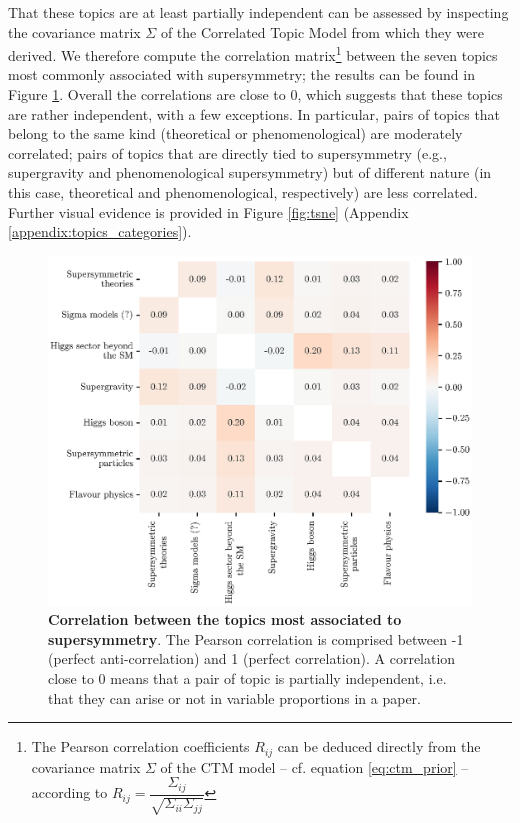 \documentclass[smallextended]{svjour3}
\begin{document}
That these topics are at least partially independent can be assessed by inspecting the covariance matrix $\Sigma$ of the Correlated Topic Model from which they were derived. We therefore compute the correlation matrix\footnote{The Pearson correlation coefficients $R_{ij}$ can be deduced directly from the covariance matrix $\Sigma$ of the CTM model -- cf. equation \eqref{eq:ctm_prior} -- according to $R_{ij} = \dfrac{\Sigma_{ij}}{\sqrt{\Sigma_{ii}\Sigma_{jj}}}$} between the seven topics most commonly associated with supersymmetry; the results can be found in Figure \ref{fig:susy_correlations}. Overall the correlations are close to 0, which suggests that these topics are rather independent, with a few exceptions. In particular, pairs of topics that belong to the same kind (theoretical or phenomenological) are moderately correlated; pairs of topics that are directly tied to supersymmetry (e.g., supergravity and phenomenological supersymmetry) but of different nature (in this case, theoretical and phenomenological, respectively) are less correlated. Further visual evidence is provided in Figure \ref{fig:tsne} (Appendix \ref{appendix:topics_categories}).

\begin{figure}
    \centering
    \hspace*{-2em}\includegraphics{Fig4.eps}
    \caption{\textbf{Correlation between the topics most associated to supersymmetry}. The Pearson correlation is comprised between -1 (perfect anti-correlation) and 1 (perfect correlation). A correlation close to 0 means that a pair of topic is partially independent, i.e. that they can arise or not in variable proportions in a paper.}
    \label{fig:susy_correlations}
\end{figure}
\end{document}
